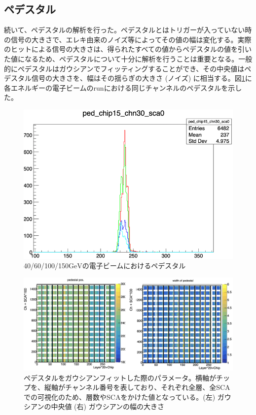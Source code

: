 \subsection{ペデスタル}
続いて、ペデスタルの解析を行った。ペデスタルとはトリガーが入っていない時の信号の大きさで、エレキ由来のノイズ等によってその値の幅は変化する。実際のヒットによる信号の大きさは、得られたすべての値からペデスタルの値を引いた値になるため、ペデスタルについて十分に解析を行うことは重要となる。一般的にぺデスタルはガウシアンでフィッティングすることができ、その中央値はペデスタル信号の大きさを、幅はその揺らぎの大きさ (ノイズ) に相当する。図\ref{pedestal}に各エネルギーの電子ビームのrunにおける同じチャンネルのペデスタルを示した。\\
\begin{figure}[H]
\begin{center}
 \includegraphics[keepaspectratio, scale=0.5]
 	{Figure/Beamtest/pedestal.png}
 		\caption{40/60/100/150$\mathrm{GeV}$の電子ビームにおけるペデスタル}
		\label{pedestal}
\end{center}
\end{figure}
\begin{figure}[H]
\begin{center}
 \includegraphics[keepaspectratio, scale=0.3]
 	{Figure/Beamtest/ped_pos.png}
 		\caption{ペデスタルをガウシアンフィットした際のパラメータ。横軸がチップを、縦軸がチャンネル番号を表しており、それぞれ全層、全SCAでの可視化のため、層数やSCAをかけた値となっている。(左) ガウシアンの中央値 (右) ガウシアンの幅の大きさ}
		\label{monitor}
\end{center}
\end{figure}

